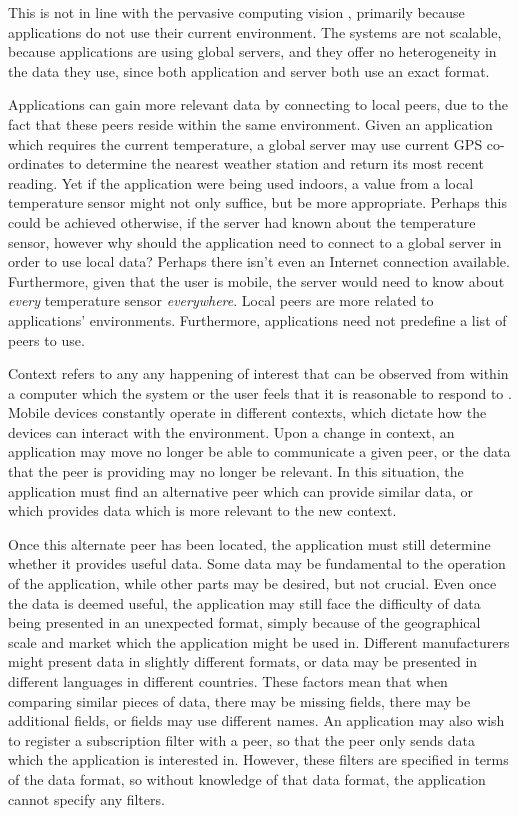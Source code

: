 \documentclass[12pt,twoside,notitlepage]{report}
\begin{document}
This is not in line with the pervasive computing vision \cite{weiser1991computer}, primarily because applications do not use their current environment. 
The systems are not scalable, because applications are using global servers, and they offer no heterogeneity\cite{saha2003pervasive} in the data they use, since both application and server both use an exact format.

Applications can gain more relevant data by connecting to local peers, due to the fact that these peers reside within the same environment.
Given an application which requires the current temperature, a global server may use current GPS co-ordinates to determine the nearest weather station and return its most recent reading. 
Yet if the application were being used indoors, a value from a local temperature sensor might not only suffice, but be more appropriate. 
Perhaps this could be achieved otherwise, if the server had known about the temperature sensor, however why should the application need to connect to a global server in order to use local data? Perhaps there isn't even an Internet connection available. 
Furthermore, given that the user is mobile, the server would need to know about {\sl every} temperature sensor {\sl everywhere}. 
Local peers are more related to applications' environments. 
Furthermore, applications need not predefine a list of peers to use.

Context refers to any any happening of interest that can be observed from within a computer which the system or the user feels that it is reasonable to respond to \cite{muhl2006distributed}. 
Mobile devices constantly operate in different contexts, which dictate how the devices can interact with the environment. 
Upon a change in context, an application may move no longer be able to communicate a given peer, or the data that the peer is providing may no longer be relevant. 
In this situation, the application must find an alternative peer which can provide similar data, or which provides data which is more relevant to the new context. 

Once this alternate peer has been located, the application must still determine whether it provides useful data. 
Some data may be fundamental to the operation of the application, while other parts may be desired, but not crucial.  
Even once the data is deemed useful, the application may still face the difficulty of data being presented in an unexpected format, simply because of the geographical scale and market which the application might be used in. 
Different manufacturers might present data in slightly different formats, or data may be presented in different languages in different countries. 
These factors mean that when comparing similar pieces of data, there may be missing fields, there may be additional fields, or fields may use different names. 
An application may also wish to register a subscription filter with a peer, so that the peer only sends data which the application is interested in. 
However, these filters are specified in terms of the data format, so without knowledge of that data format, the application cannot specify any filters.
\end{document}
